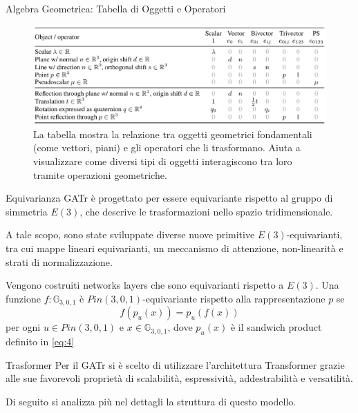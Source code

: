 \begin{frame}{Algebra Geometrica: Tabella di Oggetti e Operatori}
    \begin{figure}
        \centering
        \includegraphics[width=1\textwidth]{../Images/relazioneOggettiOperatori.png}
        \caption{La tabella mostra la relazione tra oggetti geometrici fondamentali 
        (come vettori, piani) e gli operatori che li trasformano. Aiuta a visualizzare come 
        diversi tipi di oggetti interagiscono tra loro tramite operazioni geometriche.}
        \label{fig:relazioneOggettiOperatori}
    \end{figure}
\end{frame}

\begin{frame}{Equivarianza}
    GATr è progettato per essere equivariante rispetto al gruppo di simmetria \(E(3)\), 
    che descrive le trasformazioni nello spazio tridimensionale. 

    A tale scopo, sono state sviluppate diverse nuove primitive 
    \(E(3)\)-equivarianti, tra cui mappe lineari equivarianti, un meccanismo di 
    attenzione, non-linearità e strati di normalizzazione.

    Vengono costruiti networks layers che sono equivarianti rispetto a \(E(3)\). 
    Una funzione \( f : \mathbb{G}_{3,0,1} \) è \( Pin(3,0,1) \)-equivariante rispetto
    alla rappresentazione \( p \) se 
    \[
        f(p_u(x)) = p_u(f(x))
    \]
    per ogni \( u \in Pin(3,0,1) \) e \(x \in \mathbb{G}_{3,0,1}\), dove \( p_u(x) \) è 
    il sandwich product definito in \eqref{eq:4}
\end{frame}

\begin{frame}{Trasformer}
    Per il GATr si è scelto di utilizzare l'architettura Transformer grazie alle sue 
    favorevoli proprietà di scalabilità, espressività, addestrabilità e versatilità.

    Di seguito si analizza più nel dettagli la struttura di questo modello.
\end{frame}

